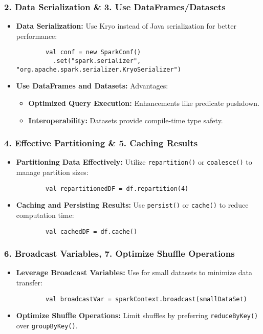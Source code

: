 \documentclass[aspectratio=169]{beamer}
\begin{document}
\begin{frame}[fragile]
    \frametitle{2. Data Serialization & 3. Use DataFrames/Datasets}
    \begin{itemize}
        \item \textbf{Data Serialization:} 
        Use Kryo instead of Java serialization for better performance:
        \begin{lstlisting}
        val conf = new SparkConf()
          .set("spark.serializer", "org.apache.spark.serializer.KryoSerializer")
        \end{lstlisting}
        
        \item \textbf{Use DataFrames and Datasets:}
        Advantages:
        \begin{itemize}
            \item \textbf{Optimized Query Execution:} Enhancements like predicate pushdown.
            \item \textbf{Interoperability:} Datasets provide compile-time type safety.
        \end{itemize}
    \end{itemize}
\end{frame}

\begin{frame}[fragile]
    \frametitle{4. Effective Partitioning & 5. Caching Results}
    \begin{itemize}
        \item \textbf{Partitioning Data Effectively:}
        Utilize \texttt{repartition()} or \texttt{coalesce()} to manage partition sizes:
        \begin{lstlisting}
        val repartitionedDF = df.repartition(4)
        \end{lstlisting}

        \item \textbf{Caching and Persisting Results:}
        Use \texttt{persist()} or \texttt{cache()} to reduce computation time:
        \begin{lstlisting}
        val cachedDF = df.cache()
        \end{lstlisting}
    \end{itemize}
\end{frame}

\begin{frame}[fragile]
    \frametitle{6. Broadcast Variables, 7. Optimize Shuffle Operations}
    \begin{itemize}
        \item \textbf{Leverage Broadcast Variables:}
        Use for small datasets to minimize data transfer:
        \begin{lstlisting}
        val broadcastVar = sparkContext.broadcast(smallDataSet)
        \end{lstlisting}
        
        \item \textbf{Optimize Shuffle Operations:}
        Limit shuffles by preferring \texttt{reduceByKey()} over \texttt{groupByKey()}.
    \end{itemize}
\end{frame}
\end{document}
